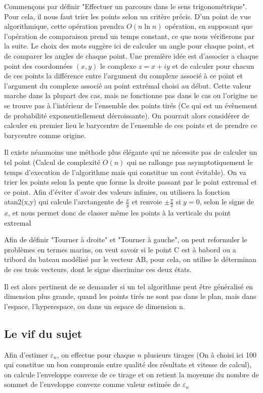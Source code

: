 \documentclass[a4paper,12pt,twoside]{article}
\begin{document}
		Commençons par définir "Effectuer un parcours dans le sens trigonométrique". Pour cela, il nous faut trier les points selon un critère précis. D'un point de vue algorithmique, cette opération prendra $O(n\ln n)$ opération, en supposant que l'opération de comparaison prend un temps constant, ce que nous vérifierons par la suite. Le choix des mots suggère ici de calculer un angle pour chaque point, et de comparer les angles de chaque point. Une première idée est d'associer a chaque point des coordonnées $(x, y)$ le complexe $z = x + iy$ et de calculer pour chacun de ces points la différence entre l'argument du complexe associé à ce point et l'argument du complexe associé au point extrémal choisi au début. Cette valeur marche dans la plupart des cas, mais ne fonctionne pas dans le cas ou l'origine ne se trouve pas à l'intérieur de l'ensemble des points tirés (Ce qui est un évènement de probabilité exponentiellement décroissante). On pourrait alors considérer de calculer en premier lieu le barycentre de l'ensemble de ces points et de prendre ce barycentre comme origine.

		Il existe néanmoins une méthode plus élégante qui ne nécessite pas de calculer un tel point (Calcul de complexité $O(n)$ qui ne rallonge pas asymptotiquement le temps d'execution de l'algorithme mais qui constitue un cout évitable). On va trier les points selon la pente que forme la droite passant par le point extremal et ce point. Afin d'éviter d'avoir des valeurs infinies, on utilisera la fonction atan2(x,y) qui calcule l'arctangente de $\frac{x}{y}$ et renvoie $\pm \frac{\pi}{2}$ si $y = 0$, selon le signe de $x$, et nous permet donc de classer même les points à la verticale du point extremal

		Afin de définir "Tourner à droite" et "Tourner à gauche", on peut reformuler le problèmes en termes marins, on veut savoir si le point C est à babord ou a tribord du bateau modélisé par le vecteur AB, pour cela, on utilise le déterminan de ces trois vecteurs, dont le signe discrimine ces deux états.

		Il est alors pertinent de se demander si un tel algorithme peut être généralisé en dimension plus grande, quand les points tirés ne sont pas dans le plan, mais dans l'espace, l'hyperespace, ou dans un espace de dimension n.



	\subsection{Le vif du sujet}
		Afin d'estimer $\varepsilon_n$, on effectue pour chaque $n$ plusieurs tirages (On à choisi ici 100 qui constitue un bon compromis entre qualité des résultats et vitesse de calcul), on calcule l'enveloppe convexe de ce tirage et on retient la moyenne du nombre de sommet de l'enveloppe convexe comme valeur estimée de $\varepsilon_n$
\end{document}
